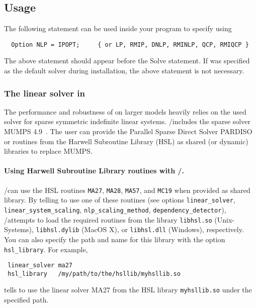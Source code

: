 \subsection{Usage}

The following statement can be used inside your \GAMS program to specify using \IPOPT
\begin{verbatim}
  Option NLP = IPOPT;     { or LP, RMIP, DNLP, RMINLP, QCP, RMIQCP }
\end{verbatim}

The above statement should appear before the Solve statement.
If \IPOPT was specified as the default solver during \GAMS installation, the above statement is not necessary.

\subsubsection{The linear solver in \IPOPT}
\label{ipoptlinearsolver}
\hypertarget{ipoptlinearsolver}{}

The performance and robustness of \IPOPT on larger models heavily relies on the used solver for sparse symmetric indefinite linear systems.
\GAMS/\IPOPT includes the sparse solver MUMPS 4.9~\cite{AmestoyDuffKosterLExcellent2001,AmestoyGuermoucheLExcellentPralet2006}.
The user can provide the Parallel Sparse Direct Solver PARDISO or routines from the Harwell Subroutine Library (HSL) as shared (or dynamic) libraries to replace MUMPS.

\paragraph{Using Harwell Subroutine Library routines with \GAMS/\IPOPT.}

\GAMS/\IPOPT can use the HSL routines \texttt{MA27}, \texttt{MA28}, \texttt{MA57}, and \texttt{MC19} when provided as shared library.
By telling \IPOPT to use one of these routines (see options \texttt{linear\_solver}, \texttt{linear\_system\_scaling}, \texttt{nlp\_scaling\_method}, \texttt{dependency\_detector}), \GAMS/\IPOPT attempts to load the required routines from the library \texttt{libhsl.so} (Unix-Systems), \texttt{libhsl.dylib} (MacOS X), or \texttt{libhsl.dll} (Windows), respectively.
You can also specify the path and name for this library with the option \texttt{hsl\_library}.
For example,
\begin{verbatim}
 linear_solver ma27
 hsl_library   /my/path/to/the/hsllib/myhsllib.so
\end{verbatim}
tells \IPOPT to use the linear solver MA27 from the HSL library \verb=myhsllib.so= under the specified path.

